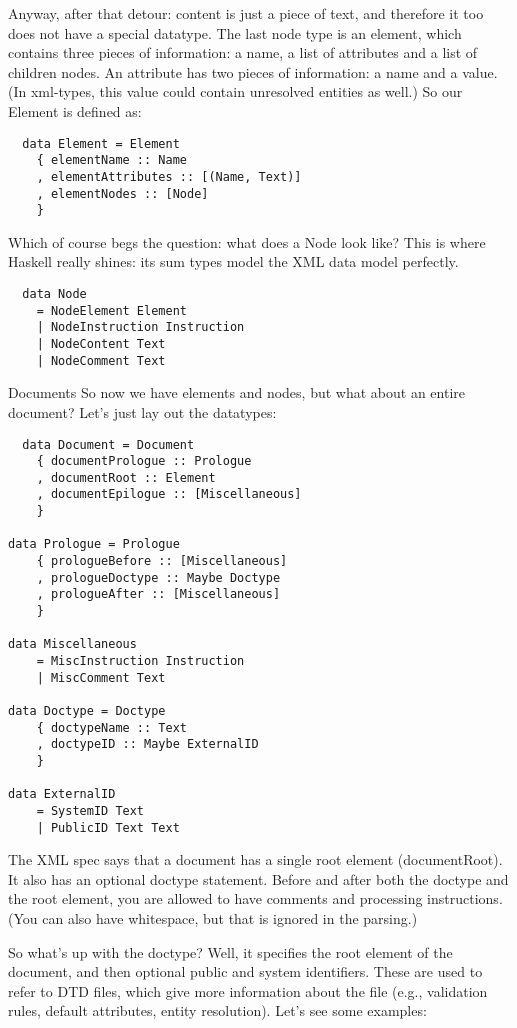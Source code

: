 Anyway, after that detour: content is just a piece of text, and therefore it too does
not have a special datatype. The last node type is an element, which contains three pieces of
information: a name, a list of attributes and a list of children nodes. An attribute has two
pieces of information: a name and a value. (In xml-types, this value could
contain unresolved entities as well.) So our Element is defined as:

\begin{lstlisting}
  data Element = Element
    { elementName :: Name
    , elementAttributes :: [(Name, Text)]
    , elementNodes :: [Node]
    }
\end{lstlisting}

  Which of course begs the question: what does a Node look like? This
   is where Haskell really shines: its sum types model the XML data model perfectly.

\begin{lstlisting}
  data Node
    = NodeElement Element
    | NodeInstruction Instruction
    | NodeContent Text
    | NodeComment Text
\end{lstlisting}

 Documents
  So now we have elements and nodes, but what about an entire document? Let's just lay out the
   datatypes:

\begin{lstlisting}
  data Document = Document
    { documentPrologue :: Prologue
    , documentRoot :: Element
    , documentEpilogue :: [Miscellaneous]
    }

data Prologue = Prologue
    { prologueBefore :: [Miscellaneous]
    , prologueDoctype :: Maybe Doctype
    , prologueAfter :: [Miscellaneous]
    }

data Miscellaneous
    = MiscInstruction Instruction
    | MiscComment Text

data Doctype = Doctype
    { doctypeName :: Text
    , doctypeID :: Maybe ExternalID
    }

data ExternalID
    = SystemID Text
    | PublicID Text Text
\end{lstlisting}

The XML spec says that a document has a single root element
(documentRoot). It also has an optional doctype statement. Before and after
both the doctype and the root element, you are allowed to have comments and processing
instructions. (You can also have whitespace, but that is ignored in the parsing.)

So what's up with the doctype? Well, it specifies the root element of the document, and then
optional public and system identifiers. These are used to refer to DTD files, which give more
information about the file (e.g., validation rules, default attributes, entity resolution). Let's
see some examples:

